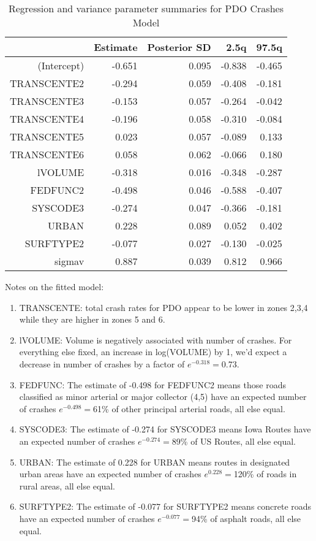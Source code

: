 \documentclass[a4paper]{article}\usepackage[]{graphicx}\usepackage[]{color}
\begin{document}
\begin{table}[h]
\centering
\begin{tabular}{rrrrr}
  \hline
 & Estimate & Posterior SD & 2.5q & 97.5q \\ 
  \hline
(Intercept) & -0.651 & 0.095 & -0.838 & -0.465 \\ 
  TRANSCENTE2 & -0.294 & 0.059 & -0.408 & -0.181 \\ 
  TRANSCENTE3 & -0.153 & 0.057 & -0.264 & -0.042 \\ 
  TRANSCENTE4 & -0.196 & 0.058 & -0.310 & -0.084 \\ 
  TRANSCENTE5 & 0.023 & 0.057 & -0.089 & 0.133 \\ 
  TRANSCENTE6 & 0.058 & 0.062 & -0.066 & 0.180 \\ 
  lVOLUME & -0.318 & 0.016 & -0.348 & -0.287 \\ 
  FEDFUNC2 & -0.498 & 0.046 & -0.588 & -0.407 \\ 
  SYSCODE3 & -0.274 & 0.047 & -0.366 & -0.181 \\ 
  URBAN & 0.228 & 0.089 & 0.052 & 0.402 \\ 
  SURFTYPE2 & -0.077 & 0.027 & -0.130 & -0.025 \\ 
  sigmav & 0.887 & 0.039 & 0.812 & 0.966 \\ 
   \hline
\end{tabular}
\caption{Regression and variance parameter summaries for PDO Crashes Model} 
\label{pdocrash}
\end{table}


Notes on the fitted model:

\begin{enumerate}
\item
TRANSCENTE: total crash rates for PDO appear to be lower in zones 2,3,4 while they are higher in zones 5 and 6. 

\item
lVOLUME: Volume is negatively associated with number of crashes. For everything else fixed, an increase in log(VOLUME) by 1, we'd expect a decrease in number of crashes by a factor of $e^{-0.318}=$0.73.

\item
FEDFUNC: The estimate of -0.498 for FEDFUNC2 means those roads classified as minor arterial or major collector (4,5) have an expected number of crashes $e^{-0.498}=$61\% of other principal arterial roads, all else equal. 

\item
SYSCODE3: The estimate of -0.274 for SYSCODE3 means Iowa Routes have an expected number of crashes $e^{-0.274}=$89\% of US Routes, all else equal.

\item
URBAN: The estimate of 0.228 for URBAN means routes in designated urban areas have an expected number of crashes $e^{0.228}=$120\% of roads in rural areas, all else equal.

\item
SURFTYPE2: The estimate of -0.077 for SURFTYPE2 means concrete roads have an expected number of crashes $e^{-0.077}=$94\% of asphalt roads, all else equal.

\end{enumerate}
\end{document}
